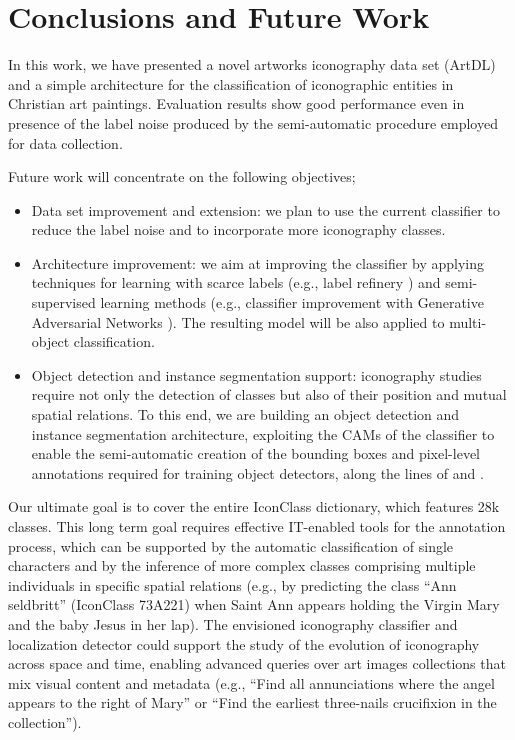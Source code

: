 \documentclass[acmlarge]{acmart}
\newcommand{\quoted}[1]{``#1''}
\begin{document}
 \section{Conclusions and Future Work}\label{sec:concl}

In this work, we have presented a novel artworks iconography data set (ArtDL) and a simple architecture  for the classification of iconographic entities in Christian art paintings. Evaluation results show good performance even in presence of the label noise produced by the semi-automatic procedure employed for data collection.  

Future work will concentrate on the following  objectives;
\begin{itemize}
    \item Data set improvement and extension: we plan to use the current classifier to reduce the label noise and to incorporate more iconography classes. 
    \item Architecture improvement: we aim at improving the classifier by applying techniques for learning with scarce labels (e.g., label refinery \cite{labelrefinery}) and semi-supervised learning methods (e.g., classifier improvement with Generative Adversarial Networks \cite{Salimans2016}). The resulting model will be also applied to multi-object classification.
    \item Object detection and instance segmentation support: iconography studies require not only the detection of classes but also of their position and mutual spatial relations. To this end, we are building an object detection and instance segmentation architecture, exploiting the CAMs of the classifier to enable the semi-automatic creation of the bounding boxes and pixel-level annotations required for training object detectors, along the lines of \cite{gonthier2018weakly} and \cite{ahn2019weakly}. 
\end{itemize}

Our ultimate goal is to cover the entire IconClass dictionary, which features 28k classes. This long term goal requires effective IT-enabled tools for the annotation process, which can be supported by the automatic classification of single characters and by the  inference of more complex classes  comprising multiple individuals in specific spatial relations (e.g., by predicting the class \quoted{Ann seldbritt}  (IconClass 73A221) when Saint Ann appears holding  the Virgin Mary and the baby Jesus in her lap). The envisioned iconography classifier and localization detector could support    the study of the evolution of iconography across space and time, enabling advanced queries over art images collections that mix visual content and metadata (e.g., \quoted{Find all annunciations where the angel appears to the right of Mary} or \quoted{Find the earliest  three-nails crucifixion in the collection}).
 


\end{document}

